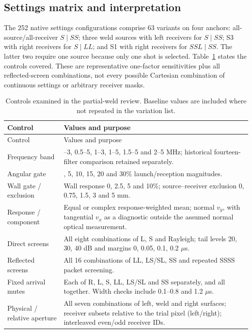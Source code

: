 \documentclass[11pt]{article}
\begin{document}
\subsection{Settings matrix and interpretation}
The 252 native settings configurations comprise 63 variants on four anchors: all-source/all-receiver $S\mid SS$; three weld sources with left receivers for $S\mid SS$; S3 with right receivers for $S\mid LL$; and S1 with right receivers for $SSL\mid SS$. The latter two require one source because only one shot is selected. Table~\ref{saft:control_inventory} states the controls covered. These are representative one-factor sensitivities plus all reflected-screen combinations, not every possible Cartesian combination of continuous settings or arbitrary receiver masks.

\begin{longtable}{@{}>{\raggedright\arraybackslash}p{.27\linewidth}>{\raggedright\arraybackslash}p{.67\linewidth}@{}}
\caption{Controls examined in the partial-weld review. Baseline values are included where not repeated in the variation list.}\label{saft:control_inventory}\\
\toprule Control & Values and purpose\\\midrule\endfirsthead
\toprule Control & Values and purpose\\\midrule\endhead
Frequency band & 0.5--3, 0.5--5, 1--3, 1--5, 1.5--5 and 2--5 MHz; historical fourteen-filter comparison retained separately.\\
Angular gate & 0, 5, 10, 15, 20 and 30\% launch/reception magnitudes.\\
Wall gate / exclusion & Wall response 0, 2.5, 5 and 10\%; source--receiver exclusion 0, 0.75, 1.5, 3 and 5 mm.\\
Response / component & Equal or complex response-weighted mean; normal $v_y$, with tangential $v_x$ as a diagnostic outside the assumed normal optical measurement.\\
Direct screens & All eight combinations of L, S and Rayleigh; tail levels 20, 30, 40 dB and margins 0, 0.05, 0.1, 0.2 $\mu$s.\\
Reflected screens & All 16 combinations of LL, LS/SL, SS and repeated SSSS packet screening.\\
Fixed arrival mutes & Each of R, L, S, LL, LS/SL and SS separately, and all together. Width checks include 0.1--0.8 and 1.2 $\mu$s.\\
Physical / relative aperture & All seven combinations of left, weld and right surfaces; receiver subsets relative to the trial pixel (left/right); interleaved even/odd receiver IDs.\\

\end{longtable}
\end{document}
